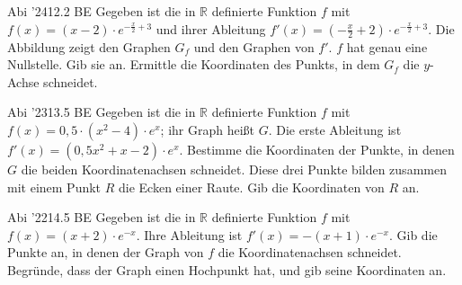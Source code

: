\documentclass[11pt]{article}
\begin{document}
\pfgruppe{}
\begin{pfaufg}{Abi ’24}{12.}{2 BE}
Gegeben ist die in $\mathbb{R}$ definierte Funktion $f$ mit $f(x) = (x - 2)\cdot e^{-\tfrac{x}{2} + 3}$ und ihrer Ableitung $f'(x) = \left(-\tfrac{x}{2} + 2\right)\cdot e^{-\tfrac{x}{2} + 3}$. Die Abbildung zeigt den Graphen $G_f$ und den Graphen von $f'$. $f$ hat genau eine Nullstelle. Gib sie an. Ermittle die Koordinaten des Punkts, in dem $G_f$ die $y$-Achse schneidet.
\par\smallskip\noindent {}\par
{}
\end{pfaufg}
\pfgruppe{}
\begin{pfaufg}{Abi ’23}{13.}{5 BE}
Gegeben ist die in $\mathbb{R}$ definierte Funktion $f$ mit $f(x) = 0{,}5\cdot(x^2 - 4)\cdot e^x$; ihr Graph heißt $G$. Die erste Ableitung ist $f'(x) = (0{,}5x^2 + x - 2)\cdot e^x$. Bestimme die Koordinaten der Punkte, in denen $G$ die beiden Koordinatenachsen schneidet. Diese drei Punkte bilden zusammen mit einem Punkt $R$ die Ecken einer Raute. Gib die Koordinaten von $R$ an.
\end{pfaufg}
\pfgruppe{}
\begin{pfaufg}{Abi ’22}{14.}{5 BE}
Gegeben ist die in $\mathbb{R}$ definierte Funktion $f$ mit $f(x) = (x + 2)\cdot e^{-x}$. Ihre Ableitung ist $f'(x) = -(x + 1)\cdot e^{-x}$. Gib die Punkte an, in denen der Graph von $f$ die Koordinatenachsen schneidet. Begründe, dass der Graph einen Hochpunkt hat, und gib seine Koordinaten an.
\end{pfaufg}
\end{document}
